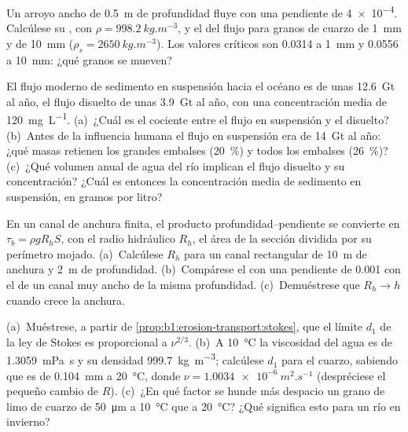 \begin{exercise}[$\star$]\label{exo:b1:erosion-transport:3}
Un arroyo ancho de \qty{0.5}{m} de profundidad fluye con una pendiente de \num{4e-4}. Calcúlese su , con $\rho = \qty{998.2}{kg.m^{-3}}$,
y el  del flujo para granos de cuarzo de \qty{1}{mm} y de \qty{10}{mm} ($\rho_s = \qty{2650}{kg.m^{-3}}$). Los valores críticos son \num{0.0314} a
\qty{1}{mm} y \num{0.0556} a \qty{10}{mm}: ¿qué granos se mueven?
\end{exercise}

\begin{exercise}[$\star$]\label{exo:b1:erosion-transport:4}
El flujo moderno de sedimento en suspensión hacia el océano es de unas \qty{12.6}{Gt} al año, el flujo disuelto de unas \qty{3.9}{Gt} al año, con una concentración media
de \qty{120}{mg.L^{-1}}. (a)~¿Cuál es el cociente entre el flujo en suspensión y el disuelto? (b)~Antes de la influencia humana el flujo en suspensión era de
\qty{14}{Gt} al año: ¿qué masas retienen los grandes embalses (\qty{20}{\percent}) y todos los embalses (\qty{26}{\percent})? (c)~¿Qué volumen anual de agua
del río implican el flujo disuelto y su concentración? ¿Cuál es entonces la concentración media de sedimento en suspensión, en gramos por litro?
\end{exercise}

\begin{exercise}[$\star\star$]\label{exo:b1:erosion-transport:5}
En un canal de anchura finita, el producto profundidad--pendiente se convierte en $\tau_b =
\rho g R_h S$, con el radio hidráulico $R_h$, el área de la sección dividida por su perímetro mojado. (a)~Calcúlese $R_h$ para un canal rectangular de
\qty{10}{m} de anchura y \qty{2}{m} de profundidad. (b)~Compárese el  con una pendiente de \num{0.001} con el de un canal muy ancho de
la misma profundidad. (c)~Demuéstrese que $R_h \to h$ cuando crece la anchura.
\end{exercise}

\begin{exercise}[$\star\star$]\label{exo:b1:erosion-transport:6}
(a)~Muéstrese, a partir de \cref{prop:b1:erosion-transport:stokes}, que el límite $d_1$ de la ley de Stokes es proporcional a $\nu^{2/3}$.
(b)~A \qty{10}{\celsius} la viscosidad del agua es de \qty{1.3059}{mPa.s} y su densidad \qty{999.7}{kg.m^{-3}}; calcúlese $d_1$ para el cuarzo, sabiendo que
es de \qty{0.104}{mm} a \qty{20}{\celsius}, donde $\nu = \qty{1.0034e-6}{m^2.s^{-1}}$ (despréciese el pequeño cambio de $R$). (c)~¿En qué factor se hunde más
despacio un grano de limo de cuarzo de \qty{50}{\micro m} a \qty{10}{\celsius} que a \qty{20}{\celsius}? ¿Qué significa esto para un río en invierno?
\end{exercise}

